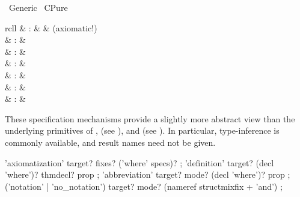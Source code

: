 %
\begin{isabellebody}%
\def\isabellecontext{Generic}%
%
\isadelimtheory
\isanewline
\isanewline
%
\endisadelimtheory
%
\isatagtheory
{}\isamarkupfalse%
\ Generic\isanewline
{}\ CPure\isanewline
{}%
\endisatagtheory
{\isafoldtheory}%
%
\isadelimtheory
%
\endisadelimtheory
%
\isamarkuptrue%
%
\isamarkuptrue%
%
\isamarkuptrue%
%
\begin{isamarkuptext}%
\begin{matharray}{rcll}
    \mbox{} & : &  & (axiomatic!)\\
    \mbox{} & : &  \\
    \mbox{} & : & \isaratt \\
    \mbox{} & : &  \\
    \mbox{}\isa{{\isachardoublequote}\isactrlsup {\isacharasterisk}{\isachardoublequote}} & : &  \\
    \mbox{} & : &  \\
    \mbox{} & : &  \\
  \end{matharray}

  These specification mechanisms provide a slightly more abstract view
  than the underlying primitives of \mbox{}, \mbox{} (see ), and \mbox{} (see
  ).  In particular, type-inference is commonly
  available, and result names need not be given.

  \begin{rail}
    'axiomatization' target? fixes? ('where' specs)?
    ;
    'definition' target? (decl 'where')? thmdecl? prop
    ;
    'abbreviation' target? mode? (decl 'where')? prop
    ;
    ('notation' | 'no\_notation') target? mode? (nameref structmixfix + 'and')
    ;


\end{rail}
\end{isamarkuptext}
\end{isabellebody}

